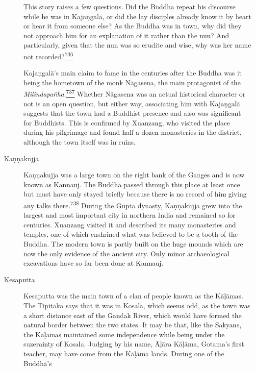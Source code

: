 \begin{description}
This story raises a few questions. Did the Buddha repeat his discourse
while he was in Kajaṇgalā, or did the lay disciples already know it by
heart or hear it from someone else? As the Buddha was in town, why did
they not approach him for an explanation of it rather than the nun? And
particularly, given that the nun was so erudite and wise, why was her
name not
recorded?\label{footprints_split_019.html_fnref736}\hyperref[footprints_split_025.htmlux5cux23fn736]{\textsuperscript{736}}

Kajaṇgalā's main claim to fame in the centuries after the Buddha was it
being the hometown of the monk Nāgasena, the main protagonist of the
\emph{Milindapañha}.\label{footprints_split_019.html_fnref737}\hyperref[footprints_split_025.htmlux5cux23fn737]{\textsuperscript{737}}
Whether Nāgasena was an actual historical character or not is an open
question, but either way, associating him with Kajaṇgalā suggests that
the town had a Buddhist presence and also was significant for Buddhists.
This is confirmed by Xuanzang, who visited the place during his
pilgrimage and found half a dozen monasteries in the district, although
the town itself was in ruins.
\item[Kaṇṇakujja]
Kaṇṇakujja was a large town on the right bank of the Ganges and is now
known as Kannauj. The Buddha passed through this place at least once but
must have only stayed briefly because there is no record of him giving
any talks
there.\label{footprints_split_019.html_fnref738}\hyperref[footprints_split_025.htmlux5cux23fn738]{\textsuperscript{738}}
During the Gupta dynasty, Kaṇṇakujja grew into the largest and most
important city in northern India and remained so for centuries. Xuanzang
visited it and described its many monasteries and temples, one of which
enshrined what was believed to be a tooth of the Buddha. The modern town
is partly built on the huge mounds which are now the only evidence of
the ancient city. Only minor archaeological excavations have so far been
done at Kannauj.
\item[Kesaputta]
Kesaputta was the main town of a clan of people known as the Kāḷāmas.
The Tipitaka says that it was in Kosala, which seems odd, as the town
was a short distance east of the Gandak River, which would have formed
the natural border between the two states. It may be that, like the
Sakyans, the Kāḷāmas maintained some independence while being under the
suzerainty of Kosala. Judging by his name, Āḷāra Kāḷāma, Gotama's first
teacher, may have come from the Kāḷāma lands. During one of the Buddha's

\end{description}
